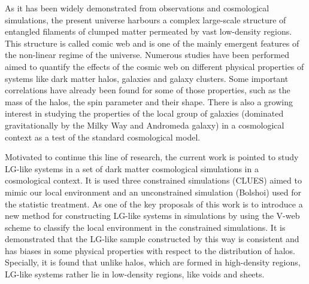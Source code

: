 

\begin{abstracts}


As it has been widely demonstrated from observations and cosmological 
simulations, the present universe harbours a complex large-scale structure
of entangled filaments of clumped matter permeated by vast low-density 
regions. This structure is called comic web and is one of the mainly 
emergent features of the non-linear regime of the universe. Numerous 
studies have been performed aimed to quantify the effects of the cosmic 
web on different physical properties of systems like dark matter halos, 
galaxies and galaxy clusters. Some important correlations have already 
been found for some of those properties, such as the mass of the halos, 
the spin parameter and their shape. There is also a growing interest in 
studying the properties of the local group of galaxies (dominated 
gravitationally by the Milky Way and Andromeda galaxy) in a cosmological
context as a test of the standard cosmological model.


Motivated to continue this line of research, the current work is pointed 
to study LG-like systems in a set of dark matter cosmological simulations 
in a cosmological context. It is used three constrained simulations (CLUES) 
aimed to mimic our local environment and an unconstrained simulation 
(Bolshoi) used for the statistic treatment. As one of the key proposals of 
this work is to introduce a new method for constructing LG-like systems 
in simulations by using the V-web scheme to classify the local environment 
in the constrained simulations. It is demonstrated that the LG-like sample 
constructed by this way is consistent and has biases in some physical 
properties with respect to the distribution of halos. Specially, it is 
found that unlike halos, which are formed in high-density regions, 
LG-like systems rather lie in low-density regions, like voids and sheets.



\end{abstracts}


